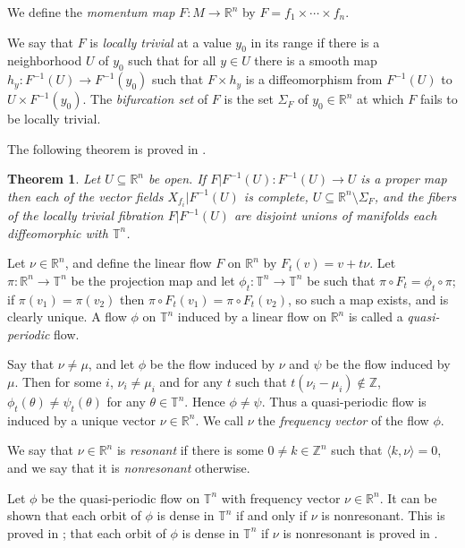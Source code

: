 \documentclass{article}
\newtheorem{theorem}{Theorem}
\begin{document}
We define the {\em momentum map} $F:M \to \mathbb{R}^n$ by
$F=f_1 \times \cdots \times f_n$.

We say that $F$ is {\em locally trivial} at a value $y_0$ in its range if
there is a neighborhood $U$ of $y_0$ such that for all $y\in U$ there is a smooth map $h_y:F^{-1}(U) \to F^{-1}(y_0)$ such that $F \times h_y$ is a diffeomorphism from $F^{-1}(U)$ to $U \times F^{-1}(y_0)$. The
{\em bifurcation set} of $F$ is the set $\Sigma_F$ of $y_0 \in \mathbb{R}^n$ at which
$F$ fails to be locally trivial.

The following theorem is proved in \cite[Theorem 5.2.21]{foundations}.

\begin{theorem}
Let $U \subseteq \mathbb{R}^n$ be open. If $F|F^{-1}(U):F^{-1}(U) \to U$
is a proper map then each of the vector fields $X_{f_i}|F^{-1}(U)$ is complete, $U \subseteq \mathbb{R}^n \setminus \Sigma_F$, and the fibers
of the locally trivial fibration $F|F^{-1}(U)$ are disjoint unions
of manifolds each diffeomorphic with $\mathbb{T}^n$.
\end{theorem}  

Let $\nu \in \mathbb{R}^n$, and define the linear flow $F$ on $\mathbb{R}^n$
by
$F_t(v)=v+t\nu$. Let $\pi:\mathbb{R}^n \to \mathbb{T}^n$ be the projection
map and let $\phi_t:\mathbb{T}^n \to \mathbb{T}^n$ be such that
$\pi \circ F_t = \phi_t \circ \pi$; if $\pi(v_1)=\pi(v_2)$ then
$\pi \circ F_t(v_1)=\pi \circ F_t(v_2)$, so such a map exists,  and is clearly unique.
A flow $\phi$ on $\mathbb{T}^n$ induced by a linear flow on $\mathbb{R}^n$ is called a {\em quasi-periodic} flow.

Say that $\nu \neq \mu$, and let $\phi$ be the flow induced by $\nu$
and $\psi$ be the flow induced by $\mu$. Then for some $i$, $\nu_i \neq
\mu_i$ and for any $t$ such that $t(\nu_i-\mu_i) \not \in \mathbb{Z}$,
$\phi_t(\theta) \neq \psi_t(\theta)$ for any $\theta \in \mathbb{T}^n$. Hence
$\phi \neq \psi$. Thus  
a quasi-periodic flow is induced by
a unique vector $\nu \in \mathbb{R}^n$. We call $\nu$ the {\em frequency vector} of the flow $\phi$.

We say that
$\nu \in \mathbb{R}^n$ is {\em resonant} if there is some $0 \neq k \in \mathbb{Z}^n$ such that $\langle k,\nu \rangle=0$, and we say that it is {\em nonresonant} otherwise.

Let $\phi$ be the quasi-periodic flow on $\mathbb{T}^n$ with frequency vector $\nu \in \mathbb{R}^n$.
It can be shown that each orbit of $\phi$ is dense in $\mathbb{T}^n$ if and only
if $\nu$ is nonresonant. This is proved in \cite[pp. 818--820]{foundations}; that each orbit of $\phi$ is dense in $\mathbb{T}^n$ if $\nu$ is nonresonant is proved in \cite[Theorem 444]{MR2445243}.
\end{document}
